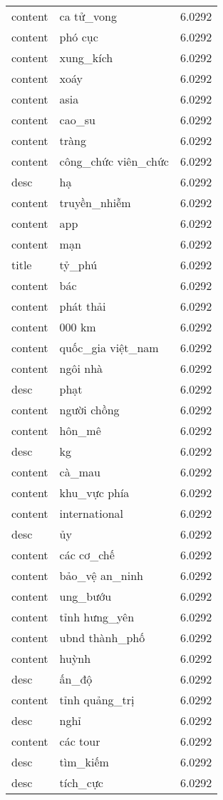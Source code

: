 \documentclass{article}
\begin{document}
\begin{tabular}{lll}
content & ca tử\_vong & 6.0292\\
content & phó cục & 6.0292\\
content & xung\_kích & 6.0292\\
content & xoáy & 6.0292\\
content & asia & 6.0292\\
content & cao\_su & 6.0292\\
content & tràng & 6.0292\\
content & công\_chức viên\_chức & 6.0292\\
desc & hạ & 6.0292\\
content & truyền\_nhiễm & 6.0292\\
content & app & 6.0292\\
content & mạn & 6.0292\\
title & tỷ\_phú & 6.0292\\
content & bác & 6.0292\\
content & phát thải & 6.0292\\
content & 000 km & 6.0292\\
content & quốc\_gia việt\_nam & 6.0292\\
content & ngôi nhà & 6.0292\\
desc & phạt & 6.0292\\
content & người chồng & 6.0292\\
content & hôn\_mê & 6.0292\\
desc & kg & 6.0292\\
content & cà\_mau & 6.0292\\
content & khu\_vực phía & 6.0292\\
content & international & 6.0292\\
desc & ủy & 6.0292\\
content & các cơ\_chế & 6.0292\\
content & bảo\_vệ an\_ninh & 6.0292\\
content & ung\_bướu & 6.0292\\
content & tỉnh hưng\_yên & 6.0292\\
content & ubnd thành\_phố & 6.0292\\
content & huỳnh & 6.0292\\
desc & ấn\_độ & 6.0292\\
content & tỉnh quảng\_trị & 6.0292\\
desc & nghỉ & 6.0292\\
content & các tour & 6.0292\\
desc & tìm\_kiếm & 6.0292\\
desc & tích\_cực & 6.0292\\

\end{tabular}
\end{document}
